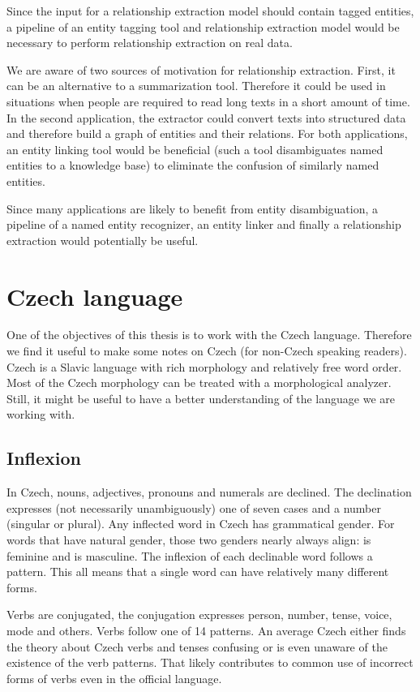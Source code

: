 Since the input for a relationship extraction model should contain tagged entities, a pipeline of an entity tagging tool and relationship extraction model would be necessary to perform relationship extraction on real data. 

We are aware of two sources of motivation for relationship extraction. First, it can be an alternative to a summarization tool. Therefore it could be used in situations when people are required to read long texts in a short amount of time. In the second application, the extractor could convert texts into structured data and therefore build a graph of entities and their relations. For both applications, an entity linking tool would be beneficial (such a tool disambiguates named entities to a knowledge base) to eliminate the confusion of similarly named entities.

\label{sec:relation_extraction_pipeline_proposal}
Since many applications are likely to benefit from entity disambiguation, a pipeline of a named entity recognizer, an entity linker and finally a relationship extraction would potentially be useful.

\section{Czech language}
\label{sec:Czech}
One of the objectives of this thesis is to work with the Czech language. Therefore we find it useful to make some notes on Czech (for non-Czech speaking readers). Czech is a Slavic language with rich morphology and relatively free word order. Most of the Czech morphology can be treated with a morphological analyzer. Still, it might be useful to have a better understanding of the language we are working with.

\subsection{Inflexion}
In Czech, nouns, adjectives, pronouns and numerals are declined. The declination expresses (not necessarily unambiguously) one of seven cases and a number (singular or plural). Any inflected word in Czech has grammatical gender. For words that have natural gender, those two genders nearly always align:   is feminine and   is masculine. The inflexion of each declinable word follows a pattern. This all means that a single word can have relatively many different forms.

Verbs are conjugated, the conjugation expresses person, number, tense, voice, mode and others. Verbs follow one of 14 patterns. An average Czech either finds the theory about Czech verbs and tenses confusing or is even unaware of the existence of the verb patterns. That likely contributes to common use of incorrect forms of verbs even in the official language.

